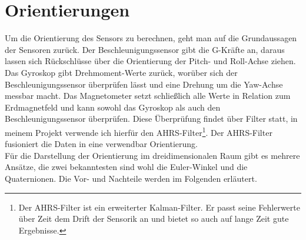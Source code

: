 \section{Orientierungen}
Um die Orientierung des Sensors zu berechnen, geht man auf die Grundaussagen der Sensoren zurück. Der 
Beschleunigungssensor gibt die G-Kräfte an, daraus lassen sich Rückschlüsse über die Orientierung 
der Pitch- und Roll-Achse ziehen. Das Gyroskop gibt Drehmoment-Werte zurück, worüber sich der Beschleunigungssensor
überprüfen lässt und eine Drehung um die Yaw-Achse messbar macht. Das Magnetometer setzt schließlich alle Werte in
Relation zum Erdmagnetfeld und kann sowohl das Gyroskop als auch den Beschleunigungssensor überprüfen. Diese Überprüfung
findet über Filter statt, in meinem Projekt verwende ich hierfür den AHRS-Filter\footnote{Der AHRS-Filter 
ist ein erweiterter Kalman-Filter. Er passt seine Fehlerwerte über Zeit dem Drift der Sensorik an und bietet so auch 
auf lange Zeit gute Ergebnisse.}. Der AHRS-Filter fusioniert die Daten in eine verwendbar Orientierung.\\
Für die Darstellung der Orientierung im dreidimensionalen Raum gibt es mehrere Ansätze, die zwei bekanntesten 
sind wohl die Euler-Winkel und die Quaternionen. Die Vor- und Nachteile werden im Folgenden erläutert.

